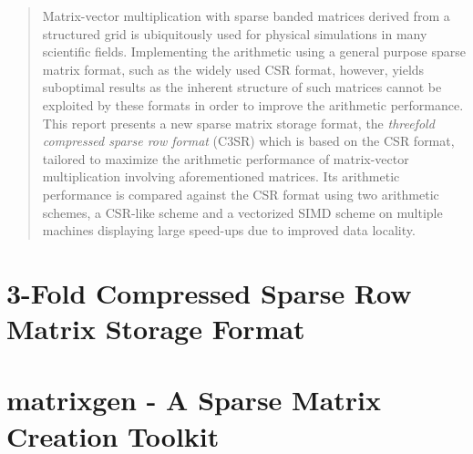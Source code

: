 \documentclass{report}
\begin{document}
\begin{minipage}[h]{\textwidth}
\begin{minipage}[h]{\textwidth}
\end{minipage} \vspace{0.5cm} \begin{abstract} Matrix-vector multiplication with sparse banded matrices derived from a
  structured grid is ubiquitously used for physical simulations in many scientific fields. Implementing the arithmetic
  using a general purpose sparse matrix format, such as the widely used CSR format, however, yields suboptimal results
  as the inherent structure of such matrices cannot be exploited by these formats in order to improve the arithmetic
  performance. This report presents a new sparse matrix storage format, the \emph{threefold compressed sparse row
  format} (C3SR) which is based on the CSR format, tailored to maximize the arithmetic performance of matrix-vector
  multiplication involving aforementioned matrices. Its arithmetic performance is compared against the CSR format using
  two arithmetic schemes, a CSR-like scheme and a vectorized SIMD scheme on multiple machines displaying large speed-ups
  due to improved data locality. \end{abstract}

\end{minipage}

\newpage
\tableofcontents
\newpage
\listoffigures

\part{3-Fold Compressed Sparse Row Matrix Storage Format}

  
  
  
  

\part{matrixgen - A Sparse Matrix Creation Toolkit}

  
  



\printbibliography
{}
\end{document}
